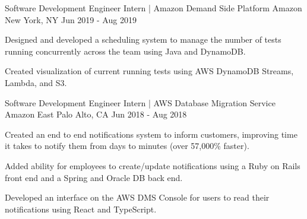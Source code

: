 \begin{cventries}
    \cventry
    {Software Development Engineer Intern | Amazon Demand Side Platform} %
    {Amazon} %
    {New York, NY} %
    {Jun 2019 - Aug 2019} %
    {
        \begin{cvitems} %
            \item {Designed and developed a scheduling system to manage the number of tests running concurrently across the team using Java and DynamoDB.}
            \item {Created visualization of current running tests using AWS DynamoDB Streams, Lambda, and S3.}
        \end{cvitems}
    }

    \cventry
    {Software Development Engineer Intern | AWS Database Migration Service} %
    {Amazon} %
    {East Palo Alto, CA} %
    {Jun 2018 - Aug 2018} %
    {
        \begin{cvitems} %
            \item {Created an end to end notifications system to inform customers, improving time it takes to notify them from days to minutes (over 57,000\% faster).}
            \item {Added ability for employees to create/update notifications using a Ruby on Rails front end and a Spring and Oracle DB back end.}
            \item {Developed an interface on the AWS DMS Console for users to read their notifications using React and TypeScript.}
        \end{cvitems}
    }

\end{cventries}
